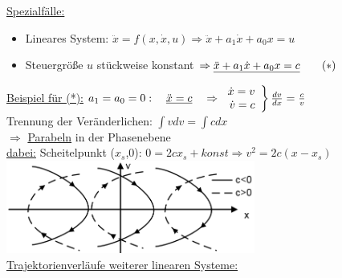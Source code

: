 \documentclass[openany,a4paper,11pt]{book}
\begin{document}
\uline{Spezialfälle:}
\begin{itemize}
    \item Lineares System: $\ddot{x}=f(x,\dot{x},u) \Rightarrow \ddot{x}+a_1\dot{x}+a_0x= u$
    \item Steuergröße $u$ stückweise konstant $\Rightarrow \uline{\ddot{x}+a_1\dot{x}+a_0x=c} \quad \quad (*)$
\end{itemize}
\uline{Beispiel für (*):} $a_1=a_0=0: \quad \uline{\ddot{x}=c}\quad \Rightarrow \left.
\begin{array}{r}
\dot{x}=v\\
\dot{v}=c
\end{array}
\right\} \frac{dv}{dx}=\frac{c}{v}$\\
Trennung der Veränderlichen: $\int vdv=\int cdx $\\
$\Rightarrow$   \quad \uline{Parabeln} in der Phasenebene\\
\uline{dabei:} Scheitelpunkt ($x_s$,0): $0=2cx_s+konst \Rightarrow v^2=2c(x-x_s)$\\
\includegraphics[height=1.2in]{imgs/NLR9.png}\\
\uline{Trajektorienverläufe weiterer linearen Systeme:} 
\end{document}
